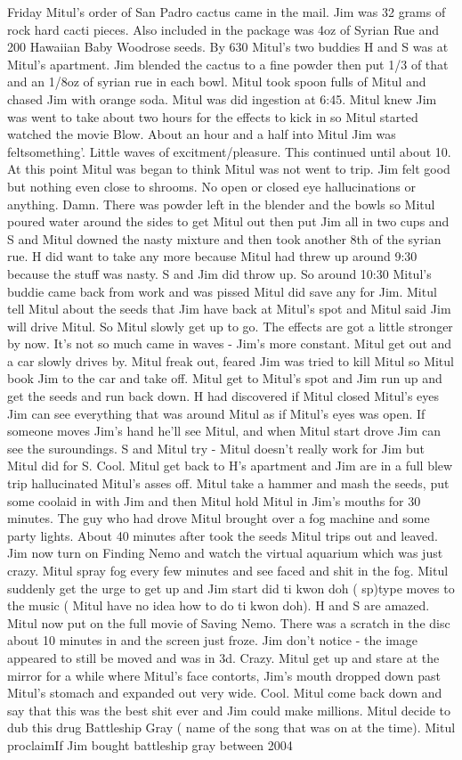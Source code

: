 \documentclass[12pt]{book}
\begin{document}
Friday Mitul's order of San Padro cactus came in the mail. Jim was 32 grams of rock hard cacti pieces. Also included in the package was 4oz of Syrian Rue and 200 Hawaiian Baby Woodrose seeds. By 630 Mitul's two buddies H and S was at Mitul's apartment. Jim blended the cactus to a fine powder then put 1/3 of that and an 1/8oz of syrian rue in each bowl. Mitul took spoon fulls of Mitul and chased Jim with orange soda. Mitul was did ingestion at 6:45. Mitul knew Jim was went to take about two hours for the effects to kick in so Mitul started watched the movie Blow. About an hour and a half into Mitul Jim was feltsomething'. Little waves of excitment/pleasure. This continued until about 10. At this point Mitul was began to think Mitul was not went to trip. Jim felt good but nothing even close to shrooms. No open or closed eye hallucinations or anything. Damn. There was powder left in the blender and the bowls so Mitul poured water around the sides to get Mitul out then put Jim all in two cups and S and Mitul downed the nasty mixture and then took another 8th of the syrian rue. H did want to take any more because Mitul had threw up around 9:30 because the stuff was nasty. S and Jim did throw up. So around 10:30 Mitul's buddie came back from work and was pissed Mitul did save any for Jim. Mitul tell Mitul about the seeds that Jim have back at Mitul's spot and Mitul said Jim will drive Mitul. So Mitul slowly get up to go. The effects are got a little stronger by now. It's not so much came in waves - Jim's more constant. Mitul get out and a car slowly drives by. Mitul freak out, feared Jim was tried to kill Mitul so Mitul book Jim to the car and take off. Mitul get to Mitul's spot and Jim run up and get the seeds and run back down. H had discovered if Mitul closed Mitul's eyes Jim can see everything that was around Mitul as if Mitul's eyes was open. If someone moves Jim's hand he'll see Mitul, and when Mitul start drove Jim can see the suroundings. S and Mitul try - Mitul doesn't really work for Jim but Mitul did for S. Cool. Mitul get back to H's apartment and Jim are in a full blew trip hallucinated Mitul's asses off. Mitul take a hammer and mash the seeds, put some coolaid in with Jim and then Mitul hold Mitul in Jim's mouths for 30 minutes. The guy who had drove Mitul brought over a fog machine and some party lights. About 40 minutes after took the seeds Mitul trips out and leaved. Jim now turn on Finding Nemo and watch the virtual aquarium which was just crazy. Mitul spray fog every few minutes and see faced and shit in the fog. Mitul suddenly get the urge to get up and Jim start did ti kwon doh ( sp)type moves to the music ( Mitul have no idea how to do ti kwon doh). H and S are amazed. Mitul now put on the full movie of Saving Nemo. There was a scratch in the disc about 10 minutes in and the screen just froze. Jim don't notice - the image appeared to still be moved and was in 3d. Crazy. Mitul get up and stare at the mirror for a while where Mitul's face contorts, Jim's mouth dropped down past Mitul's stomach and expanded out very wide. Cool. Mitul come back down and say that this was the best shit ever and Jim could make millions. Mitul decide to dub this drug Battleship Gray ( name of the song that was on at the time). Mitul proclaimIf Jim bought battleship gray between 2004 
\end{document}
